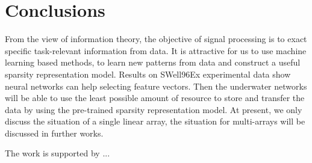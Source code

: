 \section{Conclusions}
From the view of information theory, the objective of signal processing is to exact specific task-relevant information from data.
It is attractive for us to use machine learning based methods, to learn new patterns from data and construct a useful sparsity representation model.
Results on SWell96Ex experimental data show neural networks can help selecting feature vectors. Then the underwater networks will be able to use the least possible amount of resource to store and transfer the data by using the pre-trained sparsity representation model. At present, we only discuss the situation of a single linear array, the situation for multi-arrays will be discussed in further works. 

\begin{acks}
The work is supported by ...

\end{acks}

